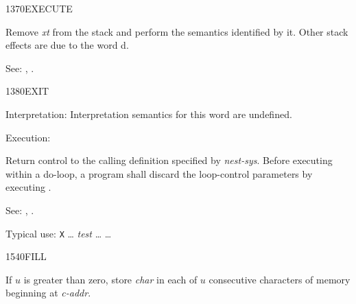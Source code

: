 \begin{newword}{1370}{EXECUTE}

	Remove \emph{xt} from the stack and perform the semantics
	identified by it. Other stack effects are due to the word
	d.

\item[See:]
	,
	.
\end{newword}


\begin{newword*}{1380}{EXIT}
\item[Interpretation:]
	Interpretation semantics for this word are undefined.

\item[Execution:]
	\stack{}{}

	Return control to the calling definition specified by
	\emph{nest-sys}. Before executing  within a do-loop,
	a program shall discard the loop-control parameters by executing
	.

\item[See:]
	,
	.

	\begin{rationale} %
		Typical use:
			\word{:} \texttt{X} {\ldots}
				\emph{test} 
				{\ldots}  
			{\ldots} \word{;}
	\end{rationale}
\end{newword*}


\begin{newword}{1540}{FILL}

	If $u$ is greater than zero, store \emph{char} in each of $u$
	consecutive characters of memory beginning at \emph{c-addr}.
\end{newword}


